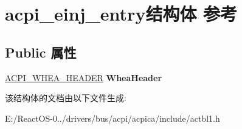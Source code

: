 \hypertarget{structacpi__einj__entry}{}\section{acpi\+\_\+einj\+\_\+entry结构体 参考}
\label{structacpi__einj__entry}
\subsection*{Public 属性}
\begin{DoxyCompactItemize}
\item 
\mbox{\label{structacpi__einj__entry_a329b05a7515ad42c460e87d3ea2d1283}} 
\hyperlink{structacpi__whea__header}{A\+C\+P\+I\+\_\+\+W\+H\+E\+A\+\_\+\+H\+E\+A\+D\+ER} {\bfseries Whea\+Header}
\end{DoxyCompactItemize}


该结构体的文档由以下文件生成\+:\begin{DoxyCompactItemize}
\item 
E\+:/\+React\+O\+S-\/0../drivers/bus/acpi/acpica/include/actbl1.\+h\end{DoxyCompactItemize}
